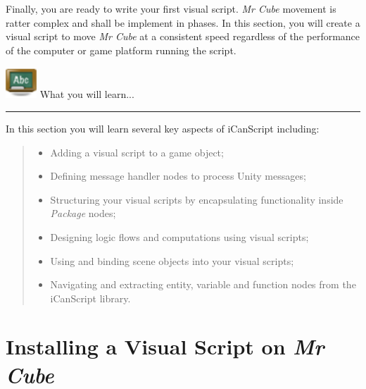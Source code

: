 Finally, you are ready to write your first visual script. \emph{Mr Cube} movement is ratter complex and shall be implement in phases. In this section, you will create a visual script to move \emph{Mr Cube} at a consistent speed regardless of the performance of the computer or game platform running the script.
\begin{tipbox}

\includegraphics[width=33pt,height=33pt]{Chalkboard-ABCs_32x32.png} {\Large \color{black} What you will learn... }

\begin{center}\rule{\textwidth}{0.4pt}\end{center}

In this section you will learn several key aspects of iCanScript including:

\begin{quote}

\begin{itemize}
\item Adding a visual script to a game object;

\item Defining message handler nodes to process Unity messages;

\item Structuring your visual scripts by encapsulating functionality inside \emph{Package} nodes;

\item Designing logic flows and computations using visual scripts;

\item Using and binding scene objects into your visual scripts;

\item Navigating and extracting entity, variable and function nodes from the iCanScript library.

\end{itemize}
\end{quote}

\end{tipbox}



\section{Installing a Visual Script on \emph{Mr Cube}}
\label{installingavisualscriptonmrcube}

